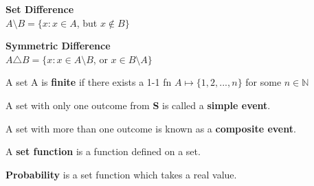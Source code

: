 \documentclass[12pt, oneside, letterpaper]{notes}
\begin{document}
\begin{mydef}
  \textbf{Set Difference}\\
  \indent $A \setminus B = \{x: x \in A$, but $x \notin B \}$
\end{mydef}

\begin{mydef}
  \textbf{Symmetric Difference}\\
  \indent $A \triangle B = \{x: x \in A \setminus B$, or 
  $x \in B \setminus A \}$
\end{mydef}

\begin{mydef}
  A set A is \textbf{finite} if there exists a 1-1 fn $A \mapsto 
  \{ 1, 2, ..., n \}$ for some $n \in \mathbb{N}$
\end{mydef}

\begin{mydef}
  A set with only one outcome from \textbf{S} is called a \textbf{simple event}.
\end{mydef}

\begin{mydef}
  A set with more than one outcome is known as a \textbf{composite event}.
\end{mydef}

\begin{mydef}
  A \textbf{set function} is a function defined on a set.
\end{mydef}

\begin{mydef}
  \textbf{Probability} is a set function which takes a real value.  
\end{mydef}
\end{document}
